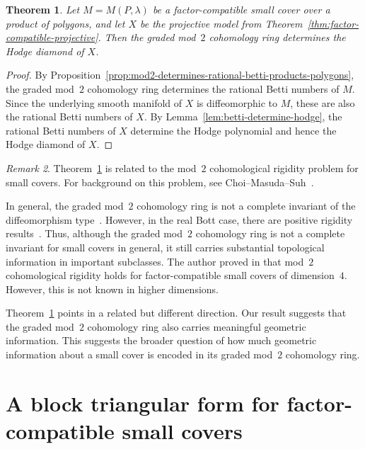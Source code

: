 \documentclass{amsart}
\newtheorem{theorem}{Theorem}[section]
\numberwithin{equation}{section}
\theoremstyle{definition}
\theoremstyle{remark}
\newtheorem{remark}[theorem]{Remark}
\begin{document}
\begin{theorem}\label{thm:mod2-rigidity-factor-compatible}
    Let $M=M(P,\lambda)$ be a factor-compatible small cover over a product of polygons, and let $X$ be the projective model from Theorem~\ref{thm:factor-compatible-projective}.
    Then the graded mod~$2$ cohomology ring determines the Hodge diamond of $X$.
\end{theorem}
\begin{proof}
    By Proposition~\ref{prop:mod2-determines-rational-betti-products-polygons}, the graded mod~$2$ cohomology ring determines the rational Betti numbers of $M$.
    Since the underlying smooth manifold of $X$ is diffeomorphic to $M$, these are also the rational Betti numbers of $X$.
    By Lemma~\ref{lem:betti-determine-hodge}, the rational Betti numbers of $X$ determine the Hodge polynomial and hence the Hodge diamond of $X$.
\end{proof}

\begin{remark}
    Theorem~\ref{thm:mod2-rigidity-factor-compatible} is related to the mod~$2$ cohomological rigidity problem for small covers.
    For background on this problem, see Choi--Masuda--Suh~\cite{Choi-Masuda-Suh2011}.
    
    In general, the graded mod~$2$ cohomology ring is not a complete invariant of the diffeomorphism type~\cite{Masuda2010}.
    However, in the real Bott case, there are positive rigidity results~\cite{Kamishima-Masuda2009,Choi-Masuda-Oum2017}.
    Thus, although the graded mod~$2$ cohomology ring is not a complete invariant for small covers in general, it still carries substantial topological information in important subclasses.
    The author proved in \cite{Choi2026} that mod~$2$ cohomological rigidity holds for factor-compatible small covers of dimension~$4$.
    However, this is not known in higher dimensions.
    
    Theorem~\ref{thm:mod2-rigidity-factor-compatible} points in a related but different direction.
    Our result suggests that the graded mod~$2$ cohomology ring also carries meaningful geometric information.
    This suggests the broader question of how much geometric information about a small cover is encoded in its graded mod~$2$ cohomology ring.
\end{remark}



\section{A block triangular form for factor-compatible small covers}\label{sec-block-triangular}
\end{document}

